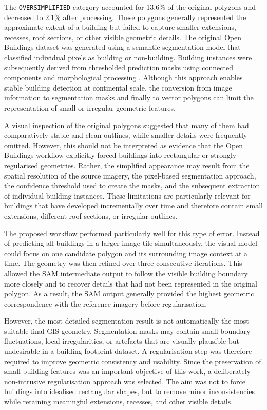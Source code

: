 The \texttt{OVERSIMPLIFIED} category accounted for 13.6\% of the original polygons and decreased to 2.1\% after processing. These polygons generally represented the approximate extent of a building but failed to capture smaller extensions, recesses, roof sections, or other visible geometric details. The original Open Buildings dataset was generated using a semantic segmentation model that classified individual pixels as building or non-building. Building instances were subsequently derived from thresholded prediction masks using connected components and morphological processing \citep{sirko2021continentalscalebuildingdetectionhigh}. Although this approach enables stable building detection at continental scale, the conversion from image information to segmentation masks and finally to vector polygons can limit the representation of small or irregular geometric features.

A visual inspection of the original polygons suggested that many of them had comparatively stable and clean outlines, while smaller details were frequently omitted. However, this should not be interpreted as evidence that the Open Buildings workflow explicitly forced buildings into rectangular or strongly regularised geometries. Rather, the simplified appearance may result from the spatial resolution of the source imagery, the pixel-based segmentation approach, the confidence threshold used to create the masks, and the subsequent extraction of individual building instances. These limitations are particularly relevant for buildings that have developed incrementally over time and therefore contain small extensions, different roof sections, or irregular outlines.

The proposed workflow performed particularly well for this type of error. Instead of predicting all buildings in a larger image tile simultaneously, the visual model could focus on one candidate polygon and its surrounding image context at a time. The geometry was then refined over three consecutive iterations. This allowed the SAM intermediate output to follow the visible building boundary more closely and to recover details that had not been represented in the original polygon. As a result, the SAM output generally provided the highest geometric correspondence with the reference imagery before regularisation.

However, the most detailed segmentation result is not automatically the most suitable final GIS geometry. Segmentation masks may contain small boundary fluctuations, local irregularities, or artefacts that are visually plausible but undesirable in a building-footprint dataset. A regularisation step was therefore required to improve geometric consistency and usability. Since the preservation of small building features was an important objective of this work, a deliberately non-intrusive regularisation approach was selected. The aim was not to force buildings into idealised rectangular shapes, but to remove minor inconsistencies while retaining meaningful extensions, recesses, and other visible details.

